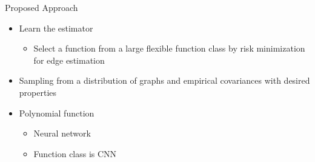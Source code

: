 \documentclass{beamer}
\begin{document}
\begin{frame}{Proposed Approach}
  \begin{itemize}
  \item Learn the estimator
    \begin{itemize}
    \item Select a function from a large flexible function class
      by risk minimization for edge estimation
    \end{itemize}
  \item Sampling from a distribution of graphs and empirical
    covariances with desired properties
  \item Polynomial function
    \begin{itemize}
    \item Neural network
    \item Function class is CNN
    \end{itemize}
  \end{itemize}
\end{frame}
\end{document}
